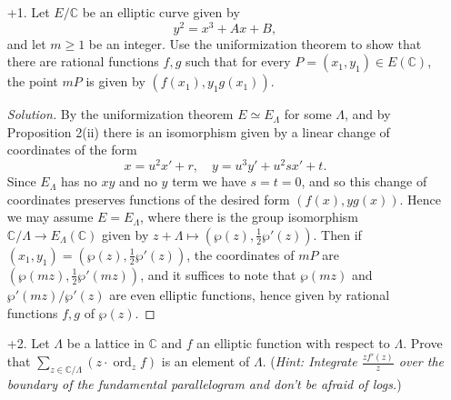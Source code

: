 \documentclass[a4paper]{article}
\theoremstyle{plain}
\theoremstyle{remark}
\theoremstyle{definition}
\DeclareMathOperator{\ord}{ord}
\newcommand{\C}{\mathbb{C}}
\begin{document}
\begin{enumerate}
    \item[+1.]
        Let $E/\C$ be an elliptic curve given by
        \begin{equation*}
            y^2 = x^3 + Ax + B,
        \end{equation*}
        and let $m\ge1$ be an integer. Use the uniformization theorem to show
        that there are rational functions $f,g$ such that for every
        $P=(x_1,y_1)\in E(\C)$, the point $mP$ is given by $(f(x_1),y_1g(x_1))$.

        \begin{proof}[Solution]
            By the uniformization theorem $E\simeq E_\Lambda$ for some $\Lambda$,
            and by Proposition 2(ii) there is an isomorphism given by a linear
            change of coordinates of the form
            \begin{equation*}
                x=u^2x'+r,\quad y=u^3y'+u^2sx'+t.
            \end{equation*}
            Since $E_\Lambda$ has no $xy$ and no $y$ term we have $s=t=0$, and
            so this change of coordinates preserves functions of the desired
            form $(f(x),yg(x))$. Hence we may assume $E=E_\Lambda$, where there
            is the group isomorphism $\C/\Lambda\to E_\Lambda(\C)$ given by
            $z+\Lambda\mapsto(\wp(z),\frac{1}{2}\wp'(z))$. Then if
            $(x_1,y_1)=(\wp(z),\frac{1}{2}\wp'(z))$, the coordinates of $mP$ are
            $(\wp(mz),\frac{1}{2}\wp'(mz))$, and it suffices to note that
            $\wp(mz)$ and $\wp'(mz)/\wp'(z)$ are even elliptic functions, hence
            given by rational functions $f,g$ of $\wp(z)$.
        \end{proof}

    \item[+2.] Let $\Lambda$ be a lattice in $\C$ and $f$ an elliptic function
        with respect to $\Lambda$. Prove that
        $\sum_{z\in\C/\Lambda}(z\cdot\ord_zf)$ is an element of $\Lambda$.
        (\textit{Hint: Integrate $\frac{zf'(z)}{z}$ over the boundary of the
        fundamental parallelogram and don't be afraid of logs.})


\end{enumerate}
\end{document}
